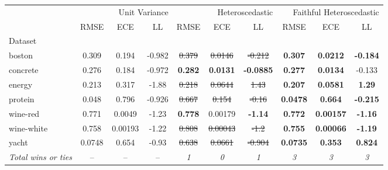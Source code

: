 \begin{tabular}{l|ccc|ccc|ccc}
\toprule
{} & \multicolumn{3}{r}{Unit Variance} & \multicolumn{3}{r}{Heteroscedastic} & \multicolumn{3}{r}{Faithful Heteroscedastic} \\
{} & {RMSE} & {ECE} & {LL} & {RMSE} & {ECE} & {LL} & {RMSE} & {ECE} & {LL} \\
{Dataset} & {} & {} & {} & {} & {} & {} & {} & {} & {} \\
\midrule
boston & 0.309 & 0.194 & -0.982 & \sout{0.379} & \sout{0.0146} & \sout{-0.212} & \textbf{0.307} & \textbf{0.0212} & \textbf{-0.184} \\
concrete & 0.276 & 0.184 & -0.972 & \textbf{0.282} & \textbf{0.0131} & \textbf{-0.0885} & \textbf{0.277} & \textbf{0.0134} & -0.133 \\
energy & 0.213 & 0.317 & -1.88 & \sout{0.218} & \sout{0.0644} & \sout{1.43} & \textbf{0.207} & \textbf{0.0581} & \textbf{1.29} \\
protein & 0.048 & 0.796 & -0.926 & \sout{0.667} & \sout{0.154} & \sout{-0.16} & \textbf{0.0478} & \textbf{0.664} & \textbf{-0.215} \\
wine-red & 0.771 & 0.0049 & -1.23 & \textbf{0.778} & 0.00179 & \textbf{-1.14} & \textbf{0.772} & \textbf{0.00157} & \textbf{-1.16} \\
wine-white & 0.758 & 0.00193 & -1.22 & \sout{0.808} & \sout{0.00043} & \sout{-1.2} & \textbf{0.755} & \textbf{0.00066} & \textbf{-1.19} \\
yacht & 0.0748 & 0.654 & -0.93 & \sout{0.638} & \sout{0.0661} & \sout{-0.904} & \textbf{0.0735} & \textbf{0.353} & \textbf{0.824} \\
\textit{{Total wins or ties}} & -- & -- & -- & \textit{1} & \textit{0} & \textit{1} & \textit{3} & \textit{3} & \textit{3} \\
\bottomrule
\end{tabular}
